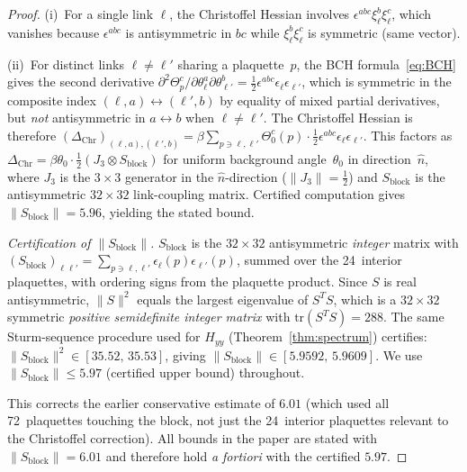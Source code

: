 \documentclass[11pt]{article}
\theoremstyle{definition}
\newcommand{\tr}{\mathrm{tr}}
\begin{document}
\begin{proof}
(i)~For a single link $\ell$, the Christoffel Hessian involves
$\epsilon^{abc}\xi_\ell^b\xi_\ell^c$, which vanishes because
$\epsilon^{abc}$ is antisymmetric in $bc$ while
$\xi_\ell^b\xi_\ell^c$ is symmetric (same vector).

(ii)~For distinct links $\ell\ne\ell'$ sharing a plaquette~$p$,
the BCH formula~\eqref{eq:BCH} gives the second derivative
$\partial^2\Theta_p^c/\partial\theta_\ell^a\partial\theta_{\ell'}^b
=\tfrac{1}{2}\epsilon^{abc}\epsilon_\ell\epsilon_{\ell'}$,
which is symmetric in the composite index $(\ell,a)\leftrightarrow(\ell',b)$
by equality of mixed partial derivatives, but \emph{not} antisymmetric
in $a\leftrightarrow b$ when $\ell\ne\ell'$.
The Christoffel Hessian is therefore
$(\Delta_{\mathrm{Chr}})_{(\ell,a),(\ell',b)}
=\beta\sum_{p\ni\ell,\ell'}\Theta_0^c(p)\cdot
\tfrac{1}{2}\epsilon^{abc}\epsilon_\ell\epsilon_{\ell'}$.
This factors as $\Delta_{\mathrm{Chr}}
=\beta\theta_0\cdot\tfrac{1}{2}(J_3\otimes S_{\mathrm{block}})$
for uniform background angle~$\theta_0$ in direction~$\hat{n}$,
where $J_3$ is the $3\times 3$ generator in the $\hat{n}$-direction
($\|J_3\|=\tfrac{1}{2}$) and $S_{\mathrm{block}}$ is the
antisymmetric $32\times 32$ link-coupling matrix.
Certified computation gives $\|S_{\mathrm{block}}\|=5.96$,
yielding the stated bound.

\emph{Certification of $\|S_{\mathrm{block}}\|$.}
$S_{\mathrm{block}}$ is the $32\times 32$ antisymmetric \emph{integer}
matrix with $(S_{\mathrm{block}})_{\ell\ell'}
=\sum_{p\ni\ell,\ell'}\epsilon_\ell(p)\epsilon_{\ell'}(p)$,
summed over the 24~interior plaquettes, with ordering signs
from the plaquette product.
Since $S$ is real antisymmetric, $\|S\|^2$ equals the largest
eigenvalue of $S^TS$, which is a $32\times 32$ symmetric
\emph{positive semidefinite integer matrix} with
$\tr(S^TS)=288$.
The same Sturm-sequence procedure used for $H_{yy}$
(Theorem~\ref{thm:spectrum}) certifies:
$\|S_{\mathrm{block}}\|^2\in[35.52,\,35.53]$, giving
$\|S_{\mathrm{block}}\|\in[5.9592,\,5.9609]$.
We use $\|S_{\mathrm{block}}\|\le 5.97$ (certified upper bound)
throughout.

This corrects the earlier conservative estimate of $6.01$
(which used all 72~plaquettes touching the block, not
just the 24~interior plaquettes relevant to the Christoffel
correction).  All bounds in the paper are stated with
$\|S_{\mathrm{block}}\|=6.01$ and therefore hold
\emph{a fortiori} with the certified $5.97$.
\end{proof}
\end{document}
